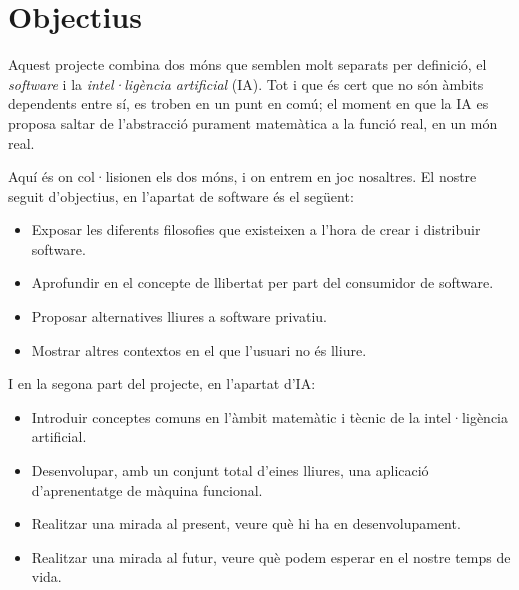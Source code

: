 \section{Objectius}

Aquest projecte combina dos móns que semblen molt separats per definició, el
\emph{software} i la \emph{intel·ligència artificial} (IA). Tot i que és cert
que no són àmbits dependents entre sí, es troben en un punt en comú;
el moment en que la IA es proposa saltar de l'abstracció
purament matemàtica a la funció real, en un món real.

Aquí és on col·lisionen els dos móns, i on entrem en joc nosaltres. El
nostre seguit d'objectius, en l'apartat de software és el següent:


\begin{itemize}
	\item Exposar les diferents filosofies que existeixen a l'hora de
	crear i distribuir software.
	\item Aprofundir en el concepte de llibertat per part
	del consumidor de software.
	\item Proposar alternatives lliures a software privatiu.
	\item Mostrar altres contextos en el que l'usuari no és lliure.
\end{itemize}

I en la segona part del projecte, en l'apartat d'IA:

\begin{itemize}
	\item Introduir conceptes comuns en l'àmbit matemàtic i tècnic
	de la intel·ligència artificial.
	\item Desenvolupar, amb un conjunt total d'eines lliures, una
	aplicació d'aprenentatge de màquina funcional.
	\item Realitzar una mirada al present, veure què hi ha en
	desenvolupament.
	\item Realitzar una mirada al futur, veure què podem esperar
	en el nostre temps de vida.
\end{itemize}
